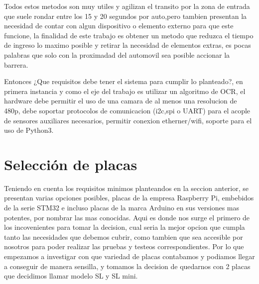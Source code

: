 Todos estos  metodos son muy utiles y agilizan el transito por la zona de entrada que suele rondar entre los 15 y 20 segundos por 
auto,pero tambien presentan la necesidad de contar con algun dispositivo o elemento externo para que este funcione, la finalidad
de este trabajo es obtener un metodo que reduzca el tiempo de ingreso lo maximo posible y retirar la necesidad de elementos
extras, es pocas palabras que solo con la proximadad del automovil sea posible accionar la barrera.

Entonces ¿Que requisitos debe tener el sistema para cumplir lo planteado?, en primera instancia y como el eje del trabajo
es utilizar un algoritmo de OCR, el hardware debe permitir el uso de una camara de al menos una resolucion de 480p, debe 
soportar protocolos de comunicacion (i2c,spi o UART) para el acople de sensores auxiliares necesarios, permitir conexion
etherner/wifi, soporte para el uso de Python3.

\section{Selección de placas}
Teniendo en cuenta los requisitos minimos planteandos en la seccion anterior, se presentan varias opciones posibles, 
placas de la empresa Raspberry Pi, embebidos de la serie STM32 e incluso placas de la marca Arduino en sus versiones mas 
potentes, por nombrar las mas conocidas. Aqui es donde nos surge el primero de los incovenientes para tomar la decision,
cual seria la mejor opcion que cumpla tanto las necesidades que debemos cubrir, como tambien que sea accesible por nosotros
para poder realizar las pruebas y testeos correspondientes.
Por lo que empezamos a investigar con que variedad de placas contabamos y podiamos llegar a conseguir de manera sensilla, 
y tomamos la decision de quedarnos con 2 placas que decidimos llamar modelo SL y SL mini.
